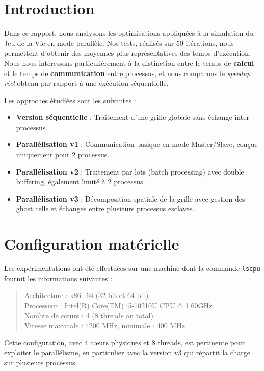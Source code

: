 \documentclass[a4paper,13pt]{book}
\begin{document}
\section{Introduction}
Dans ce rapport, nous analysons les optimisations appliquées à la simulation du Jeu de la Vie en mode parallèle. Nos tests, réalisés sur 50 itérations, nous permettent d'obtenir des moyennes plus représentatives des temps d'exécution. Nous nous intéressons particulièrement à la distinction entre le temps de \textbf{calcul} et le temps de \textbf{communication} entre processus, et nous comparons le \emph{speedup réel} obtenu par rapport à une exécution séquentielle.

Les approches étudiées sont les suivantes :
\begin{itemize}
    \item \textbf{Version séquentielle} : Traitement d'une grille globale sans échange inter-processus.
    \item \textbf{Parallélisation v1} : Communication basique en mode Master/Slave, conçue uniquement pour 2 processus.
    \item \textbf{Parallélisation v2} : Traitement par lots (batch processing) avec double buffering, également limité à 2 processus.
    \item \textbf{Parallélisation v3} : Décomposition spatiale de la grille avec gestion des ghost cells et échanges entre plusieurs processus esclaves.
\end{itemize}

\section{Configuration matérielle}
Les expérimentations ont été effectuées sur une machine dont la commande \texttt{lscpu} fournit les informations suivantes :
\begin{quote}
Architecture : x86\_64 (32-bit et 64-bit)\\
Processeur : Intel(R) Core(TM) i5-10210U CPU @ 1.60GHz\\
Nombre de c{\oe}urs : 4 (8 threads au total)\\
Vitesse maximale : 4200 MHz, minimale : 400 MHz
\end{quote}
Cette configuration, avec 4 c{\oe}urs physiques et 8 threads, est pertinente pour exploiter le parallélisme, en particulier avec la version v3 qui répartit la charge sur plusieurs processus.
\end{document}

